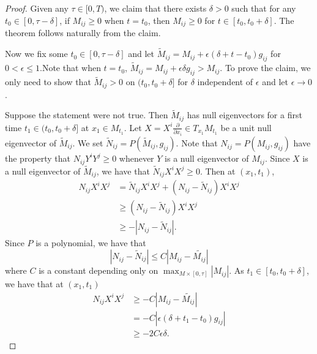 \begin{proof}
	
	Given any $\tau \in  [0,T)$, we claim that there exists $\delta >0$ such that for any $t_0 \in [0,\tau -\delta]$, if $M_{ij }^{} \geq 0$ when $t=t_0$, then $M_{ij }^{} \geq 0$ for $t \in [t_0,t_0+\delta ]$. The theorem follows naturally from the claim.
	
	Now we fix some $t_0 \in [0,\tau -\delta]$ and let $\tilde{M}_{ij }^{}  = M_{ij }^{} + \epsilon (\delta +t-t_0) g_{ij}^{} $ for $0<\epsilon \leq 1$.Note that when $t=t_0$, $\tilde{M}_{ij }^{}  = M_{ij }^{} + \epsilon \delta g_{ij}^{} >M_{ij }^{}$. To prove the claim, we only need to show that $\tilde{M}_{ij }^{}>0$ on $(t_0,t_0+\delta ]$ for $\delta $ independent of $\epsilon $ and let $\epsilon \to 0$.
	
	Suppose the statement were not true. Then $\tilde{M}_{ij }^{}$ has null eigenvectors for a first time $t_1 \in (t_0,t_0+\delta]$ at $x_1 \in M_{t_1}$. Let $X=X^i \frac{\partial }{\partial x_{i}} \in T_{x_1}M_{t_1}$ be a unit null eigenvector of $\tilde{M}_{ij }^{}$. We set $\tilde{N}_{ij }^{} =P(\tilde{M}_{ij }^{} , g_{ij }^{} )$. Note that $N_{ij }^{} = P(M_{ij }^{} , g_{ij}^{} )$ have the property that  ${N}_{ij }^{} Y^i Y^j \geq 0$ whenever $Y$ is a null eigenvector of $M_{ij }^{} $. Since $X$ is a null eigenvector of $\tilde{M}_{ij }^{}$, we have that $\tilde{N}_{ij }^{} X^i X^j \geq 0$. Then at $(x_1,t_1)$, 
	\begin{equation*}
	\begin{split}
		N_{ij }^{} X^i X^j
	&= \tilde{N}_{ij }^{} X^i X^j + (N_{ij }^{} - \tilde{N}_{ij }^{}) X^i X^j\\
	& \geq (N_{ij }^{} - \tilde{N}_{ij }^{}) X^i X^j\\
	& \geq -\left| N_{ij }^{} - \tilde{N}_{ij }^{} \right|.
	\end{split}
	\end{equation*}
	Since $P$ is a polynomial, we have that \[\left| N_{ij }^{} - \tilde{N}_{ij }^{} \right| \leq C \left| M_{ij }^{} - \tilde{M_{ij }^{}} \right|\] where $C$ is a constant depending only on $\max_{M \times [0,\tau ]} \left| M_{ij }^{}  \right|. $ As $t_1 \in [t_0,t_0+\delta ]$, we have that at $(x_1,t_1)$
	\begin{equation*}
	\begin{split}
		N_{ij }^{} X^i X^j 
		& \geq -C \left| M_{ij }^{} - \tilde{M_{ij }^{}} \right|\\
		&= -C \left| \epsilon (\delta + t_1-t_0) g_{ij }^{}  \right|\\
		& \geq -2C \epsilon \delta.
	\end{split}
	\end{equation*}


\end{proof}
